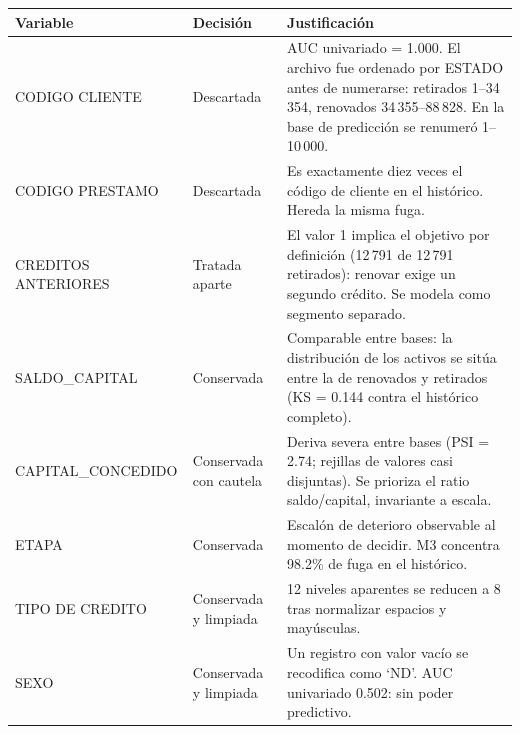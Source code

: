 \begin{tabular}{@{}p{3.3cm}p{2.6cm}p{8.3cm}@{}}
\toprule
\textbf{Variable} & \textbf{Decisión} & \textbf{Justificación} \\
\midrule
CODIGO CLIENTE & Descartada & AUC univariado = 1.000. El archivo fue ordenado por ESTADO antes de numerarse: retirados 1--34\,354, renovados 34\,355--88\,828. En la base de predicción se renumeró 1--10\,000. \\
CODIGO PRESTAMO & Descartada & Es exactamente diez veces el código de cliente en el histórico. Hereda la misma fuga. \\
CREDITOS ANTERIORES & Tratada aparte & El valor 1 implica el objetivo por definición (12\,791 de 12\,791 retirados): renovar exige un segundo crédito. Se modela como segmento separado. \\
SALDO\_CAPITAL & Conservada & Comparable entre bases: la distribución de los activos se sitúa entre la de renovados y retirados (KS = 0.144 contra el histórico completo). \\
CAPITAL\_CONCEDIDO & Conservada con cautela & Deriva severa entre bases (PSI = 2.74; rejillas de valores casi disjuntas). Se prioriza el ratio saldo/capital, invariante a escala. \\
ETAPA & Conservada & Escalón de deterioro observable al momento de decidir. M3 concentra 98.2\% de fuga en el histórico. \\
TIPO DE CREDITO & Conservada y limpiada & 12 niveles aparentes se reducen a 8 tras normalizar espacios y mayúsculas. \\
SEXO & Conservada y limpiada & Un registro con valor vacío se recodifica como `ND'. AUC univariado 0.502: sin poder predictivo. \\
\bottomrule
\end{tabular}